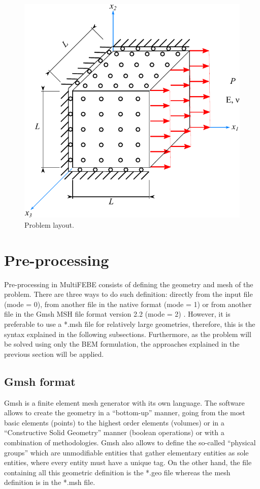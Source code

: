 \documentclass[a4]{article}
\begin{document}
\begin{figure}[h]
	\centering
	\includegraphics{cube.pdf}
	\caption{Problem layout.}
	\label{fig:layout}
\end{figure}

\section{Pre-processing} 
Pre-processing in MultiFEBE consists of defining the geometry and mesh of the problem. There are three ways to do such definition: directly from the input file (mode = 0), from another file in the native format (mode = 1) or from another file in the Gmsh MSH file format version 2.2 (mode = 2) \cite{gmsh}. However, it is preferable to use a *.msh file for relatively large geometries, therefore, this is the syntax explained in the following subsections. Furthermore, as the problem will be solved using only the BEM formulation, the approaches explained in the previous section will be applied.      

\subsection{Gmsh format}
Gmsh \cite{gmsh, gmshweb} is a finite element mesh generator with its own language. The software allows to create the geometry in a “bottom-up” manner, going from the most basic elements (points) to the highest order elements (volumes) or in a “Constructive Solid Geometry” manner (boolean operations) or with a combination of methodologies. Gmsh also allows to define  the so-called “physical groups” which are unmodifiable entities that gather elementary entities as sole entities, where every entity must have a unique tag. On the other hand, the file containing all this geometric definition is the *.geo file whereas the mesh definition is in the *.msh file. 
\end{document}

